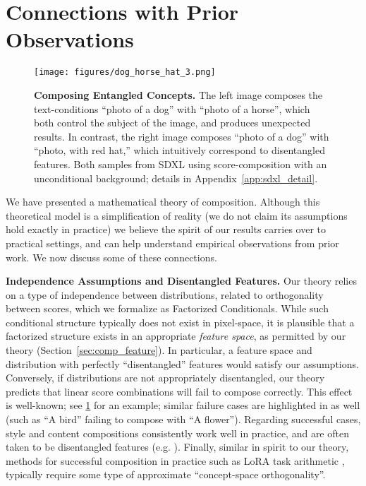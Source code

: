 \section{Connections with Prior Observations}
\label{sec:prior_connect}

\begin{figure}
    \centering
    \texttt{[image: figures/dog\_horse\_hat\_3.png]}
    \caption{{\bf Composing Entangled Concepts.}
    The left image composes the text-conditions ``photo of a dog''
    with ``photo of a horse'', which both control the subject of the image,
    and produces unexpected results.
    In contrast, the right image composes ``photo of a dog''
    with ``photo, with red hat,'' which intuitively correspond
    to disentangled features.
    Both samples from SDXL using score-composition with
    an unconditional background; details in Appendix~\ref{app:sdxl_detail}.
    }
    \label{fig:dog-horse-hat}
\end{figure}



We have presented a mathematical theory of composition.
Although this theoretical model is a simplification of reality (we do not claim its assumptions hold exactly in practice) we believe the spirit of our results carries over to practical settings,
and can help understand empirical observations from prior work.
We now discuss some of these connections.


\textbf{Independence Assumptions and Disentangled Features.}
Our theory relies on a type of independence 
between distributions, related to orthogonality between scores, which we formalize as Factorized Conditionals.
While such conditional structure typically does not exist in pixel-space,
it is plausible that a factorized structure exists in an appropriate \emph{feature space}, as permitted by our theory (Section~\ref{sec:comp_feature}).
In particular, a feature space and distribution with perfectly ``disentangled'' features
would satisfy our assumptions.
Conversely, if distributions are not appropriately disentangled,
our theory predicts that linear score combinations will fail to compose correctly.
This effect is well-known; see \cref{fig:dog-horse-hat}
for an example;
similar failure cases are highlighted
in \citet{liu2022compositional} as well
(such as ``A bird'' failing to compose with ``A flower'').
Regarding successful cases, style and content compositions
consistently work well in practice,
and are often taken to be disentangled features
(e.g. \citet{karras2019style,gatys2016image,zhu2017unpaired}).
Finally, similar in spirit to our theory, methods for successful composition in practice
such as LoRA task arithmetic \cite{zhang2023composing, ilharco2022editing},
typically require some type of approximate ``concept-space orthogonality''.


